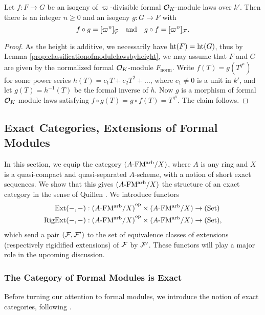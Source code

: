 \documentclass[../main.tex]{subfiles}
\begin{document}
\begin{lem}\label{lem:inverseqisog}
  Let $f: F \to G$ be an isogeny of $\varpi$-divisible formal $\mathcal{O}_K$-module laws
  over $k'$. Then there is an 
  integer $n \geq 0$ and an isogeny $g: G \to F$ with 
  \begin{equation*}
    f \circ g = [\varpi^n]_{\mathcal{G}} \quad \text{and} \quad g \circ f = [\varpi^n]_{\mathcal{F}}.
  \end{equation*}
  \begin{proof}[Proof]
    As the height is additive, we necessarily have 
    $\textnormal{ht}(F) = \textnormal{ht}(G)$, thus by Lemma
    \ref{prop:classificationofmodulelawsbyheight}, we may assume that $F$ and
    $G$ are given by the normalized formal $\mathcal{O}_K$-module
    $F_\mathrm{norm}$.
    Write $f(T) = g(T^{q^n})$ for some power series $h(T) = c_1 T + c_2T^2 +
    \dots$, where $c_1 \neq 0$ is a unit in $k'$, and let $g(T) = h^{-1}(T)$ be the 
    formal inverse of $h$. Now $g$ is a morphism of formal $\mathcal{O}_K$-module laws
    satisfying $f \circ g(T) = g\circ f(T) = T^{q^n}$. The claim follows.
  \end{proof}
\end{lem}


\subsection{Exact Categories, Extensions of Formal Modules} %
 \label{sub:Exact Categories Extensions of Formal Modules}

In this section, we equip the category ${({A}\text-\allowbreak\mathrm{FM^{arb}}/{X})}$, where 
$A$ is any ring and $X$ is a quasi-compact and quasi-separated $A$-scheme,
with a notion of short exact sequences. We show that this gives ${({A}\text-\allowbreak\mathrm{FM^{arb}}/{X})}$ 
the structure of an exact category in the sense of 
Quillen \cite[Appendix A]{keller1990chain}. We introduce functors
\begin{align*}
  \operatorname{Ext}(-,-)&: {({A}\text-\allowbreak\mathrm{FM^{arb}}/{X})}^{\mathrm{op}} \times {({A}\text-\allowbreak\mathrm{FM^{arb}}/{X})} \to {(\mathrm{Set})} \\
  \operatorname {RigExt}(-,-)&: {({A}\text-\allowbreak\mathrm{FM^{arb}}/{X})}^{\mathrm{op}} \times {({A}\text-\allowbreak\mathrm{FM^{arb}}/{X})} \to {(\mathrm{Set})},
\end{align*}
which send a pair $(\mathcal{F}, \mathcal{F}')$ to the set of equivalence classes of 
extensions (respectively rigidified extensions) of $\mathcal{F}$ by $\mathcal{F}'$. These functors
will play a major role in the upcoming discussion.

\subsubsection{The Category of Formal Modules is Exact} %
\label{ssub:The Category of Formal Modules is Exact}
Before turning our attention to formal modules, we introduce the notion of 
exact categories, following \cite[Appendix A]{keller1990chain}.
\end{document}
